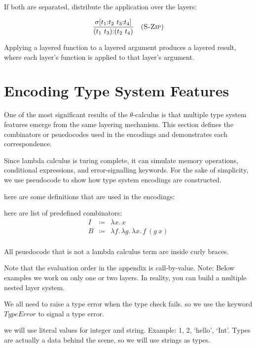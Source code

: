 \documentclass[11pt,letterpaper]{article}
\theoremstyle{definition}
\begin{document}
If both are separated, distribute the application over the layers:

$$
\dfrac{\sigma[t_1{:}t_2\ t_3{:}t_4]}{(t_1\ t_3){:}(t_2\ t_4)}
\quad (\textsc{S-Zip})
$$

Applying a layered function to a layered argument produces a layered result,
where each layer's function is applied to that layer's argument.

\fi


\section{Encoding Type System Features}\label{sec:encodings}

One of the most significant results of the $\theta$-calculus is that multiple
type system features emerge from the same layering mechanism. This section
defines the combinators or psuedocodes used in the encodings and demonstrates
each correspondence. 

Since lambda calculus is turing complete, it can simulate memory operations, 
conditional expressions, and error-signalling keywords. 
For the sake of simplicity, we use pseudocode to show how type system encodings are constructed.

here are some definitions that are used in the encodings:

here are list of predefined combinators:
$$
\begin{array}{rcl}
I &\coloneqq& \lambda x.\, x \\[4pt]
B &\coloneqq& \lambda f.\,\lambda g.\,\lambda x.\, f\ (g\ x) \\[4pt]
\end{array}
$$


All psuedocode that is not a lambda calculus term are inside curly braces.

Note that the evaluation order in the appendix is call-by-value.
Note: Below examples we work on only one or two layers. In reality, you can build a multiple nested layer system.

We all need to raise a type error when the type check fails. so we use the keyword $\mathit{TypeError}$ to signal a type error.

we will use literal values for integer and string. Example: 1, 2, `hello', `Int'. Types are actually a data behind the scene, so we will use strings as types.
\end{document}
